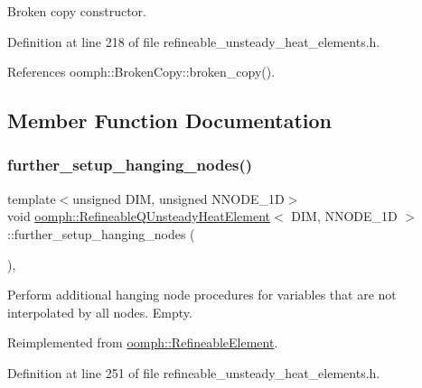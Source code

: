Broken copy constructor. 



Definition at line 218 of file refineable\+\_\+unsteady\+\_\+heat\+\_\+elements.\+h.



References oomph\+::\+Broken\+Copy\+::broken\+\_\+copy().



\subsection{Member Function Documentation}
\mbox{\label{classoomph_1_1RefineableQUnsteadyHeatElement_a4a0c3c617a3b58aaedf71b1e174b607f}} 
\subsubsection{\texorpdfstring{further\+\_\+setup\+\_\+hanging\+\_\+nodes()}{further\_setup\_hanging\_nodes()}}
{\footnotesize\ttfamily template$<$unsigned D\+IM, unsigned N\+N\+O\+D\+E\+\_\+1D$>$ \\
void \hyperlink{classoomph_1_1RefineableQUnsteadyHeatElement}{oomph\+::\+Refineable\+Q\+Unsteady\+Heat\+Element}$<$ D\+IM, N\+N\+O\+D\+E\+\_\+1D $>$\+::further\+\_\+setup\+\_\+hanging\+\_\+nodes (\begin{DoxyParamCaption}{ }\end{DoxyParamCaption})\hspace{0.3cm}{\ttfamily [inline]}, {\ttfamily [virtual]}}



Perform additional hanging node procedures for variables that are not interpolated by all nodes. Empty. 



Reimplemented from \hyperlink{classoomph_1_1RefineableElement_a86ea01c485f7ff822dce74b884312ccb}{oomph\+::\+Refineable\+Element}.



Definition at line 251 of file refineable\+\_\+unsteady\+\_\+heat\+\_\+elements.\+h.

